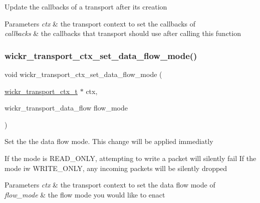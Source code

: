 Update the callbacks of a transport after it\textquotesingle{}s creation


\begin{DoxyParams}{Parameters}
{\em ctx} & the transport context to set the callbacks of \\
\hline
{\em callbacks} & the callbacks that transport should use after calling this function \\
\hline
\end{DoxyParams}
\mbox{\label{group__wickr__transport__ctx_ga338125913ff273beec721b341de639a3}} 
\subsubsection{\texorpdfstring{wickr\+\_\+transport\+\_\+ctx\+\_\+set\+\_\+data\+\_\+flow\+\_\+mode()}{wickr\_transport\_ctx\_set\_data\_flow\_mode()}}
{\footnotesize\ttfamily void wickr\+\_\+transport\+\_\+ctx\+\_\+set\+\_\+data\+\_\+flow\+\_\+mode (\begin{DoxyParamCaption}\item[{\mbox{\hyperlink{structwickr__transport__ctx}{wickr\+\_\+transport\+\_\+ctx\+\_\+t}} $\ast$}]{ctx,  }\item[{wickr\+\_\+transport\+\_\+data\+\_\+flow}]{flow\+\_\+mode }\end{DoxyParamCaption})}

Set the the data flow mode. This change will be applied immediatly

If the mode is R\+E\+A\+D\+\_\+\+O\+N\+LY, attempting to write a packet will silently fail If the mode iw W\+R\+I\+T\+E\+\_\+\+O\+N\+LY, any incoming packets will be silently dropped


\begin{DoxyParams}{Parameters}
{\em ctx} & the transport context to set the data flow mode of \\
\hline
{\em flow\+\_\+mode} & the flow mode you would like to enact \\
\hline
\end{DoxyParams}
\mbox{\label{group__wickr__transport__ctx_gac1865750950d6ff5ba3850c5f03ab3c9}} 
